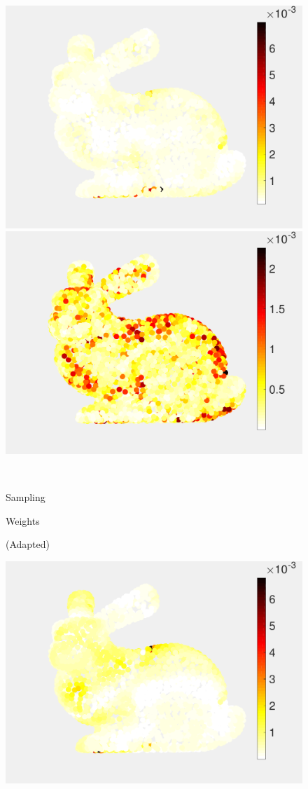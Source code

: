 \documentclass[journal, 10pt]{IEEEtran}
\begin{document}
{\begin{figure}[H]
\begin{minipage}[m]{0.4\linewidth}
\centerline{\includegraphics[width=.85\linewidth]{fig_rec_low_weights}}
\end{minipage}
\begin{minipage}[m]{0.4\linewidth}
\centerline{\includegraphics[width=.85\linewidth]{fig_rec_band_weights}}
\end{minipage} \\
\begin{minipage}[m]{0.16\linewidth}
\centerline{\small{Sampling}}
\centerline{\small{Weights}}
\centerline{\small{(Adapted)}}
\end{minipage}
\begin{minipage}[m]{0.4\linewidth}
\centerline{\includegraphics[width=.85\linewidth]{fig_rec_low_weights_adapted}}

\end{minipage}
\end{figure}}
\end{document}
